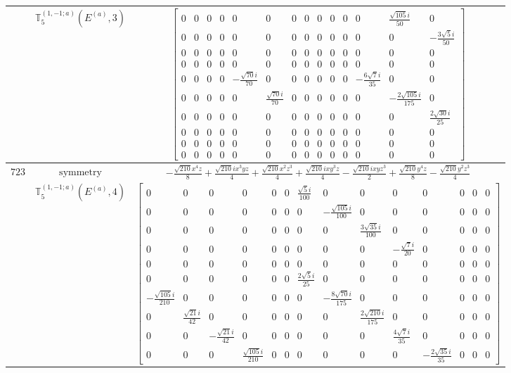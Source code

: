 \documentclass[fleqn,8pt,landscape]{jsarticle}
\begin{document}
\begin{longtable}{ccc}
$  $ & $ \mathbb{T}_{5}^{(1,-1;a)}(E^{(a)},3) $ & $ \begin{bmatrix} 0 & 0 & 0 & 0 & 0 & 0 & 0 & 0 & 0 & 0 & 0 & 0 & \frac{\sqrt{105} i}{50} & 0 \\ 0 & 0 & 0 & 0 & 0 & 0 & 0 & 0 & 0 & 0 & 0 & 0 & 0 & - \frac{3 \sqrt{5} i}{50} \\ 0 & 0 & 0 & 0 & 0 & 0 & 0 & 0 & 0 & 0 & 0 & 0 & 0 & 0 \\ 0 & 0 & 0 & 0 & 0 & 0 & 0 & 0 & 0 & 0 & 0 & 0 & 0 & 0 \\ 0 & 0 & 0 & 0 & - \frac{\sqrt{70} i}{70} & 0 & 0 & 0 & 0 & 0 & 0 & - \frac{6 \sqrt{7} i}{35} & 0 & 0 \\ 0 & 0 & 0 & 0 & 0 & \frac{\sqrt{70} i}{70} & 0 & 0 & 0 & 0 & 0 & 0 & - \frac{2 \sqrt{105} i}{175} & 0 \\ 0 & 0 & 0 & 0 & 0 & 0 & 0 & 0 & 0 & 0 & 0 & 0 & 0 & \frac{2 \sqrt{30} i}{25} \\ 0 & 0 & 0 & 0 & 0 & 0 & 0 & 0 & 0 & 0 & 0 & 0 & 0 & 0 \\ 0 & 0 & 0 & 0 & 0 & 0 & 0 & 0 & 0 & 0 & 0 & 0 & 0 & 0 \\ 0 & 0 & 0 & 0 & 0 & 0 & 0 & 0 & 0 & 0 & 0 & 0 & 0 & 0 \end{bmatrix} $ \\ \hline
$ 723 $ & $ \text{symmetry} $ & $ - \frac{\sqrt{210} x^{4} z}{8} + \frac{\sqrt{210} i x^{3} y z}{4} + \frac{\sqrt{210} x^{2} z^{3}}{4} + \frac{\sqrt{210} i x y^{3} z}{4} - \frac{\sqrt{210} i x y z^{3}}{2} + \frac{\sqrt{210} y^{4} z}{8} - \frac{\sqrt{210} y^{2} z^{3}}{4} $ \\
$  $ & $ \mathbb{T}_{5}^{(1,-1;a)}(E^{(a)},4) $ & $ \begin{bmatrix} 0 & 0 & 0 & 0 & 0 & 0 & \frac{\sqrt{5} i}{100} & 0 & 0 & 0 & 0 & 0 & 0 & 0 \\ 0 & 0 & 0 & 0 & 0 & 0 & 0 & - \frac{\sqrt{105} i}{100} & 0 & 0 & 0 & 0 & 0 & 0 \\ 0 & 0 & 0 & 0 & 0 & 0 & 0 & 0 & \frac{3 \sqrt{35} i}{100} & 0 & 0 & 0 & 0 & 0 \\ 0 & 0 & 0 & 0 & 0 & 0 & 0 & 0 & 0 & - \frac{\sqrt{7} i}{20} & 0 & 0 & 0 & 0 \\ 0 & 0 & 0 & 0 & 0 & 0 & 0 & 0 & 0 & 0 & 0 & 0 & 0 & 0 \\ 0 & 0 & 0 & 0 & 0 & 0 & \frac{2 \sqrt{5} i}{25} & 0 & 0 & 0 & 0 & 0 & 0 & 0 \\ - \frac{\sqrt{105} i}{210} & 0 & 0 & 0 & 0 & 0 & 0 & - \frac{8 \sqrt{70} i}{175} & 0 & 0 & 0 & 0 & 0 & 0 \\ 0 & \frac{\sqrt{21} i}{42} & 0 & 0 & 0 & 0 & 0 & 0 & \frac{2 \sqrt{210} i}{175} & 0 & 0 & 0 & 0 & 0 \\ 0 & 0 & - \frac{\sqrt{21} i}{42} & 0 & 0 & 0 & 0 & 0 & 0 & \frac{4 \sqrt{7} i}{35} & 0 & 0 & 0 & 0 \\ 0 & 0 & 0 & \frac{\sqrt{105} i}{210} & 0 & 0 & 0 & 0 & 0 & 0 & - \frac{2 \sqrt{35} i}{35} & 0 & 0 & 0 \end{bmatrix} $ \\ \hline

\end{longtable}
\end{document}

